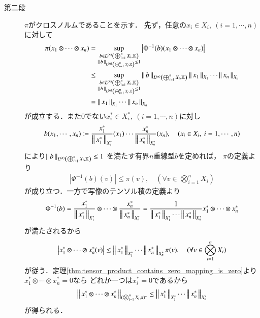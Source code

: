 \begin{prf}
\begin{description}
			\item[第二段]
				$\pi$がクロスノルムであることを示す．
				先ず，任意の$x_i \in X_i,\ (i=1,\cdots,n)$に対して
				\begin{align}
					\pi(x_1 \otimes \cdots \otimes x_n) 
					&= \sup{\substack{b \in \ContLn{\bigoplus_{i=1}^n X_i}{\K}{n} \\ \Norm{b}{\ContLn{\bigoplus_{i=1}^n X_i}{\K}{n}} \leq 1}}{\left| \Phi^{-1}(b)(x_1 \otimes \cdots \otimes x_n) \right|} \\
					&\leq \sup{\substack{b \in \ContLn{\bigoplus_{i=1}^n X_i}{\K}{n} \\ \Norm{b}{\ContLn{\bigoplus_{i=1}^n X_i}{\K}{n}} \leq 1}}{\Norm{b}{\ContLn{\bigoplus_{i=1}^n X_i}{\K}{n}}\Norm{x_1}{X_1} \cdots \Norm{x_n}{X_n}} \\
					&= \Norm{x_1}{X_1} \cdots \Norm{x_n}{X_n}
				\end{align}
				が成立する．また0でない$x_i^* \in X_i^*,\ (i=1,\cdots,n)$に対し
				\begin{align}
					b(x_1,\cdots,x_n) 
					\coloneqq \frac{x_1^*}{\Norm{x_1^*}{X_1^*}}(x_1) \cdots \frac{x_n^*}{\Norm{x_n^*}{X_n^*}}(x_n),
					\quad (x_i \in X_i,\ i=1,\cdots,n)
				\end{align}
				により$\Norm{b}{\ContLn{\bigoplus_{i=1}^n X_i}{\K}{n}} \leq 1$
				を満たす有界$n$重線型$b$を定めれば，
				$\pi$の定義より
				\begin{align}
					\left| \Phi^{-1}(b)(v) \right| \leq \pi(v),
					\quad (\forall v \in \bigotimes_{i=1}^n X_i)
				\end{align}
				が成り立つ．一方で写像のテンソル積の定義より
				\begin{align}
					\Phi^{-1}(b) 
					= \frac{x_1^*}{\Norm{x_1^*}{X_1^*}} 
						\otimes \cdots \otimes \frac{x_n^*}{\Norm{x_n^*}{X_n^*}}
					= \frac{1}{\Norm{x_1^*}{X_1^*} \cdots \Norm{x_n^*}{X_n^*}} 
						x_1^* \otimes \cdots \otimes x_n^*
				\end{align}
				が満たされるから
				\begin{align}
					\left| x_1^* \otimes \cdots \otimes x_n^*(v) \right| 
						\leq \Norm{x_1^*}{X_1^*} \cdots \Norm{x_n^*}{X_n^*} \pi(v),
					\quad (\forall v \in \bigotimes_{i=1}^n X_i)
				\end{align}
				が従う．定理\ref{thm:tensor_product_contains_zero_mapping_is_zero}より
				$x_1^* \otimes \cdots \otimes x_n^* = 0$なら
				どれか一つは$x_i^* = 0$であるから
				\begin{align}
					\Norm{x_1^* \otimes \cdots \otimes x_n^*}{(\bigotimes_{i=1}^n X_i,\pi)^*} 
					\leq \Norm{x_1^*}{X_1^*} \cdots \Norm{x_n^*}{X_n^*}
				\end{align}
				が得られる．
				

\end{description}
\end{prf}

